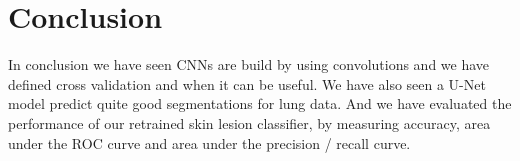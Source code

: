 \section{Conclusion}
In conclusion we have seen CNNs are build by using convolutions and we have defined cross validation and when it can be useful. We have also seen a U-Net model predict quite good segmentations for lung data. And we have evaluated the performance of our retrained skin lesion classifier, by measuring accuracy, area under the ROC curve and area under the precision / recall curve.